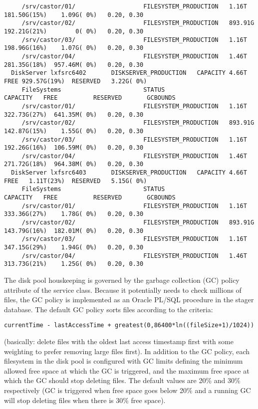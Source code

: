 \begin{verbatim}
     /srv/castor/01/                   FILESYSTEM_PRODUCTION   1.16T      181.50G(15%)    1.09G( 0%)   0.20, 0.30
     /srv/castor/02/                   FILESYSTEM_PRODUCTION   893.91G    192.21G(21%)        0( 0%)   0.20, 0.30
     /srv/castor/03/                   FILESYSTEM_PRODUCTION   1.16T      198.96G(16%)    1.07G( 0%)   0.20, 0.30
     /srv/castor/04/                   FILESYSTEM_PRODUCTION   1.46T      281.35G(18%)  957.46M( 0%)   0.20, 0.30
  DiskServer lxfsrc6402       DISKSERVER_PRODUCTION   CAPACITY 4.66T      FREE 929.57G(19%)  RESERVED   3.22G( 0%)
     FileSystems                       STATUS                  CAPACITY   FREE          RESERVED       GCBOUNDS
     /srv/castor/01/                   FILESYSTEM_PRODUCTION   1.16T      322.73G(27%)  641.35M( 0%)   0.20, 0.30
     /srv/castor/02/                   FILESYSTEM_PRODUCTION   893.91G    142.87G(15%)    1.55G( 0%)   0.20, 0.30
     /srv/castor/03/                   FILESYSTEM_PRODUCTION   1.16T      192.26G(16%)  106.59M( 0%)   0.20, 0.30
     /srv/castor/04/                   FILESYSTEM_PRODUCTION   1.46T      271.72G(18%)  964.38M( 0%)   0.20, 0.30
  DiskServer lxfsrc6403       DISKSERVER_PRODUCTION   CAPACITY 4.66T      FREE   1.11T(23%)  RESERVED   5.15G( 0%)
     FileSystems                       STATUS                  CAPACITY   FREE          RESERVED       GCBOUNDS
     /srv/castor/01/                   FILESYSTEM_PRODUCTION   1.16T      333.36G(27%)    1.78G( 0%)   0.20, 0.30
     /srv/castor/02/                   FILESYSTEM_PRODUCTION   893.91G    143.79G(16%)  182.01M( 0%)   0.20, 0.30
     /srv/castor/03/                   FILESYSTEM_PRODUCTION   1.16T      347.15G(29%)    1.94G( 0%)   0.20, 0.30
     /srv/castor/04/                   FILESYSTEM_PRODUCTION   1.46T      313.73G(21%)    1.25G( 0%)   0.20, 0.30
\end{verbatim}
\normalsize

The disk pool houskeeping is governed by the garbage collection (GC) policy attribute of the
service class. Because it potentially needs to check millions of files, the GC policy is
implemented as an Oracle PL/SQL procedure in the stager database. The default GC policy sorts
files according to the criteria:
\begin{verbatim}
currentTime - lastAccessTime + greatest(0,86400*ln((fileSize+1)/1024))
\end{verbatim}
(basically: delete files with the oldest last access timestamp first with some weighting to
prefer removing large files first).
In addition to the GC policy, each filesystem in the disk pool is configured with GC limits
defining the minimum allowed free space at which the GC is triggered, and the maximum free
space at which the GC should stop deleting files. The default values are 20\% and 30\% respectively
(GC is triggered when free space goes below 20\% and a running GC will stop deleting files when
there is 30\% free space).

